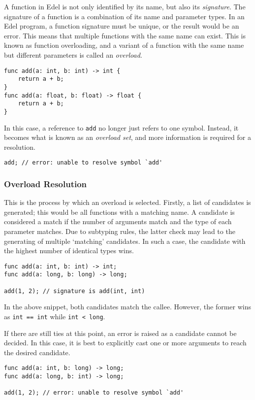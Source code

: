 A function in Edel is not only identified by its name, but also its \textit{signature}.
The signature of a function is a combination of its name and parameter types.
In an Edel program, a function signature must be unique, or the result would be an error.
This means that multiple functions with the same name can exist.
This is known as function overloading, and a variant of a function with the same name but different parameters is called an \textit{overload}.

\begin{lstlisting}[language=CustomLang]
func add(a: int, b: int) -> int {
    return a + b;
}
func add(a: float, b: float) -> float {
    return a + b;
}
\end{lstlisting}

In this case, a reference to \texttt{add} no longer just refers to one symbol.
Instead, it becomes what is known as an \textit{overload set}, and more information is required for a resolution.

\begin{lstlisting}[language=CustomLang]
add; // error: unable to resolve symbol `add'
\end{lstlisting}

\subsubsection{Overload Resolution}

This is the process by which an overload is selected.
Firstly, a list of candidates is generated; this would be all functions with a matching name.
A candidate is considered a match if the number of arguments match and the type of each parameter matches.
Due to subtyping rules, the latter check may lead to the generating of multiple `matching' candidates.
In such a case, the candidate with the highest number of identical types wins.

\begin{lstlisting}[language=CustomLang]
func add(a: int, b: int) -> int;
func add(a: long, b: long) -> long;

add(1, 2); // signature is add(int, int)
\end{lstlisting}

In the above snippet, both candidates match the callee.
However, the former wins as \texttt{int == int} while \texttt{int < long}.

If there are still ties at this point, an error is raised as a candidate cannot be decided.
In this case, it is best to explicitly cast one or more arguments to reach the desired candidate.

\begin{lstlisting}[language=CustomLang]
func add(a: int, b: long) -> long;
func add(a: long, b: int) -> long;

add(1, 2); // error: unable to resolve symbol `add'
\end{lstlisting}
